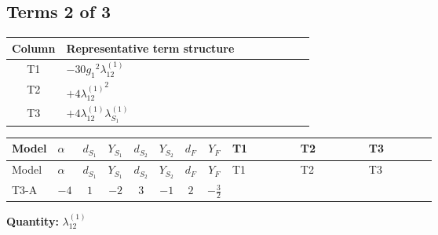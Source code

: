 \documentclass[8pt]{article}
\begin{document}
\begin{landscape}
\subsection*{Terms 2 of 3}
\begin{center}
\begin{tabular}{@{}c >{\raggedright\arraybackslash}p{0.82\linewidth}@{}}
\toprule
Column & Representative term structure \\
\midrule
T1 & \(\displaystyle -30 {g_1}^2 {\lambda_{12}^{(1)}}\) \\
\midrule
T2 & \(\displaystyle +4 {\lambda_{12}^{(1)}}^2\) \\
\midrule
T3 & \(\displaystyle +4 {\lambda_{12}^{(1)}} {\lambda_{S_1}^{(1)}}\) \\
\midrule
\bottomrule
\end{tabular}
\end{center}
\smallskip
\tiny
\begin{longtable}{@{}llcccccc >{\raggedright\arraybackslash}p{0.21\linewidth} >{\raggedright\arraybackslash}p{0.21\linewidth} >{\raggedright\arraybackslash}p{0.21\linewidth}@{}}
\toprule
Model & $\alpha$ & $d_{S_1}$ & $Y_{S_1}$ & $d_{S_2}$ & $Y_{S_2}$ & $d_F$ & $Y_F$ & T1 & T2 & T3 \\
\midrule
\endfirsthead
\toprule
Model & $\alpha$ & $d_{S_1}$ & $Y_{S_1}$ & $d_{S_2}$ & $Y_{S_2}$ & $d_F$ & $Y_F$ & T1 & T2 & T3 \\
\midrule
\endhead
T3-A & $-4$ & $1$ & $-2$ & $3$ & $-1$ & $2$ & $-\frac{3}{2}$ & \scriptsize\adjustbox{max width=\linewidth}{$\begin{gathered} -30 {g_1}^2 {\lambda_{12}^{(1)}}\end{gathered}$} & \scriptsize\adjustbox{max width=\linewidth}{$\begin{gathered} +4 {\lambda_{12}^{(1)}}^2\end{gathered}$} & \scriptsize\adjustbox{max width=\linewidth}{$\begin{gathered} +4 {\lambda_{12}^{(1)}} {\lambda_{S_1}^{(1)}}\end{gathered}$} \\
\midrule
\bottomrule
\end{longtable}
\clearpage
\noindent\textbf{Quantity: }$\lambda_{12}^{(1)}$\par\smallskip

\end{landscape}
\end{document}
